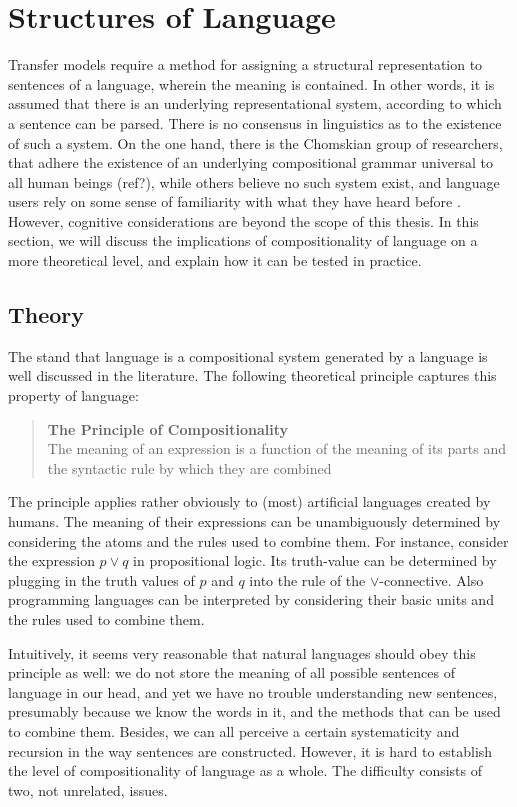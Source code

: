 \documentclass{report}
\theoremstyle{definition}
\theoremstyle{plain}
\begin{document}
\section{Structures of Language}

Transfer models require a method for assigning a structural representation to sentences of a language, wherein the meaning is contained. In other words, it is assumed that there is an underlying representational system, according to which a sentence can be parsed. There is no consensus in linguistics as to the existence of such a system. On the one hand, there is the Chomskian group of researchers, that adhere the existence of an underlying compositional grammar universal to all human beings (ref?), while others believe no such system exist, and language users rely on some sense of familiarity with what they have heard before \citep[e.g.,][]{frank2012hierarchical}. However, cognitive considerations are beyond the scope of this thesis. In this section, we will discuss the implications of compositionality of language on a more theoretical level, and explain how it can be tested in practice.

\subsection{Theory}

The stand that language is a compositional system generated by a language is well discussed in the literature. The following theoretical principle captures this property of language:

\begin{quote}
\textbf{The Principle of Compositionality}\\
The meaning of an expression is a function of the meaning of its parts and the syntactic rule by which they are combined \citep{partee1984compositionality}
\end{quote}

The principle applies rather obviously to (most) artificial languages created by humans. The meaning of their expressions can be unambiguously determined by considering the atoms and the rules used to combine them. For instance, consider the expression $p\lor q$ in propositional logic. Its truth-value can be determined by plugging in the truth values of $p$ and $q$ into the rule of the $\lor$-connective. Also programming languages can be interpreted by considering their basic units and the rules used to combine them.

Intuitively, it seems very reasonable that natural languages should obey this principle as well: we do not store the meaning of all possible sentences of language in our head, and yet we have no trouble understanding new sentences, presumably because we know the words in it, and the methods that can be used to combine them. Besides, we can all perceive a certain systematicity and recursion in the way sentences are constructed. However, it is hard to establish the level of compositionality of language as a whole. The difficulty consists of two, not unrelated, issues.
\end{document}
